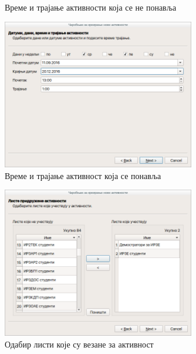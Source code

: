 \documentclass[a4paper, 12pt, diplomski]{etfcyr}
\begin{document}
\begin{justify}
\begin{figure}[H]
\begin{center}
						\end{center}
						\caption{Време и трајање активности која се не понавља}
						\label{figure:single_time}
					\end{figure}
					\begin{figure}[H]
						\begin{center}
							\includegraphics[width=0.75\textwidth]{manual/activity_wizard_time_slots.png}
						\end{center}
						\caption{Време и трајање активност која се понавља}
						\label{figure:multiple_time}
					\end{figure}
					\begin{figure}[H]
						\begin{center}
							\includegraphics[width=0.75\textwidth]{manual/activity_wizard_lists.png}
						\end{center}
						\caption{Одабир листи које су везане за активност}
						\label{figure:activity_lists}
					\end{figure}
					\begin{figure}[H]
						\begin{center}

\end{center}
\end{figure}
\end{justify}
\end{document}
